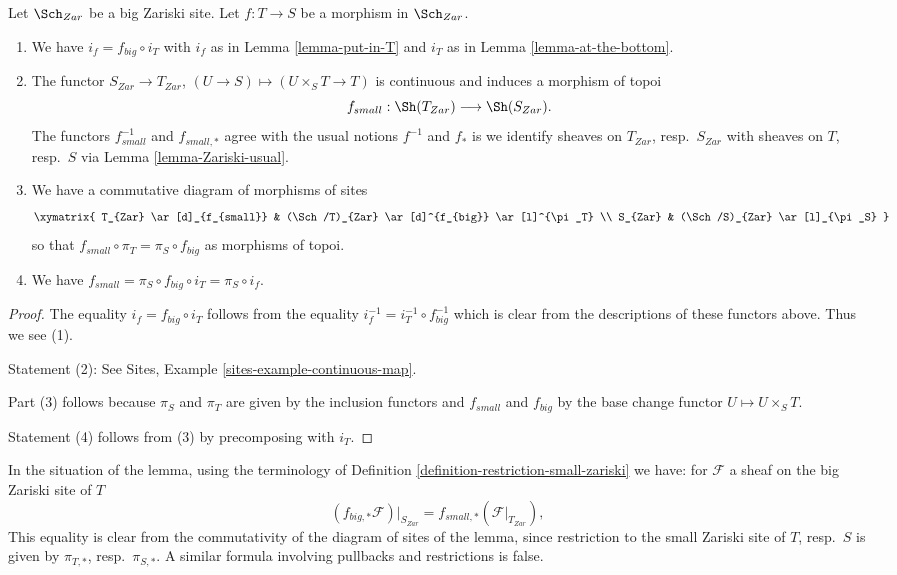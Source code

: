 \begin{lemma}
\label{lemma-morphism-big-small}
Let $\Sch_{Zar}$ be a big Zariski site.
Let $f : T \to S$ be a morphism in $\Sch_{Zar}$.
\begin{enumerate}
\item We have $i_f = f_{big} \circ i_T$ with $i_f$ as in
Lemma \ref{lemma-put-in-T} and $i_T$ as in
Lemma \ref{lemma-at-the-bottom}.
\item The functor $S_{Zar} \to T_{Zar}$,
$(U \to S) \mapsto (U \times_S T \to T)$ is continuous and induces
a morphism of topoi
$$
f_{small} :
\Sh(T_{Zar})
\longrightarrow
\Sh(S_{Zar}).
$$
The functors $f_{small}^{-1}$ and $f_{small, *}$ agree with
the usual notions $f^{-1}$ and $f_*$ is we identify sheaves
on $T_{Zar}$, resp.\ $S_{Zar}$ with sheaves on $T$, resp.\ $S$
via Lemma \ref{lemma-Zariski-usual}.
\item We have a commutative diagram of morphisms of sites
$$
\xymatrix{
T_{Zar} \ar[d]_{f_{small}} &
(\Sch/T)_{Zar} \ar[d]^{f_{big}} \ar[l]^{\pi_T} \\
S_{Zar} &
(\Sch/S)_{Zar} \ar[l]_{\pi_S}
}
$$
so that $f_{small} \circ \pi_T = \pi_S \circ f_{big}$ as morphisms of topoi.
\item We have $f_{small} = \pi_S \circ f_{big} \circ i_T = \pi_S \circ i_f$.
\end{enumerate}
\end{lemma}

\begin{proof}
The equality $i_f = f_{big} \circ i_T$ follows from the
equality $i_f^{-1} = i_T^{-1} \circ f_{big}^{-1}$ which is
clear from the descriptions of these functors above.
Thus we see (1).

\medskip\noindent
Statement (2): See Sites, Example \ref{sites-example-continuous-map}.

\medskip\noindent
Part (3) follows because $\pi_S$ and $\pi_T$ are given by
the inclusion functors and $f_{small}$ and $f_{big}$ by the
base change functor $U \mapsto U \times_S T$.

\medskip\noindent
Statement (4) follows from (3) by precomposing with $i_T$.
\end{proof}

\noindent
In the situation of the lemma, using the terminology of
Definition \ref{definition-restriction-small-zariski}
we have: for $\mathcal{F}$ a sheaf on the big Zariski site of $T$
$$
(f_{big, *}\mathcal{F})|_{S_{Zar}} =
f_{small, *}(\mathcal{F}|_{T_{Zar}}),
$$
This equality is clear from the commutativity of the diagram of
sites of the lemma, since restriction to the small Zariski site of
$T$, resp.\ $S$ is given by $\pi_{T, *}$, resp.\ $\pi_{S, *}$. A similar
formula involving pullbacks and restrictions is false.

